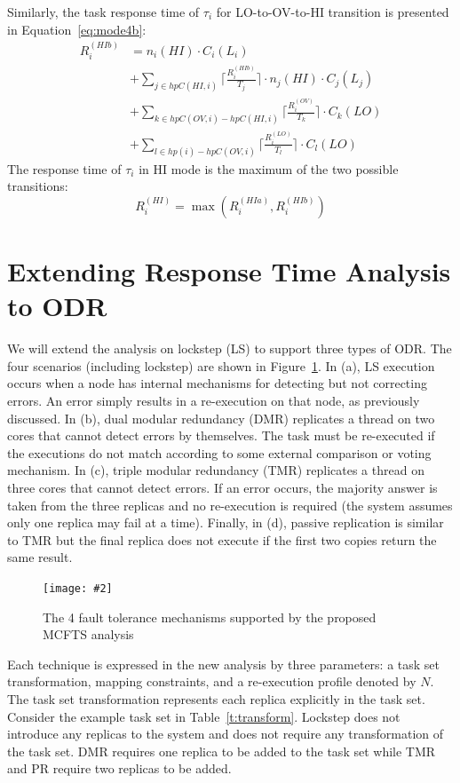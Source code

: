 \documentclass[conference]{IEEEtran}
\newcommand{\addfigure}[4]{
\begin{figure}[fh]
	\centering
	\texttt{[image: \#2]}
	\caption{#3}
	\label{#4}
\end{figure}
}
\begin{document}
Similarly, the task response time of $\tau_i$ for LO-to-OV-to-HI transition is presented in Equation~\eqref{eq:mode4b}:
\begin{equation}\label{eq:mode4b}
\begin{aligned}
R_i^{(HIb)} & = n_i(HI) \cdot C_i(L_i) \\
&  +\sum_{j \in hpC(HI,i)}\Big\lceil\frac{R_i^{(HIb)}}{T_j}\Big\rceil \cdot n_j(HI) \cdot C_j(L_j) \\
&  +\sum_{k \in hpC(OV,i)-hpC(HI,i)}\Big\lceil\frac{R_i^{(OV)}}{T_k}\Big\rceil \cdot C_k(LO)\\
&  +\sum_{l \in hp(i)-hpC(OV,i)}\Big\lceil\frac{R_i^{(LO)}}{T_l}\Big\rceil \cdot C_l(LO)
\end{aligned}
\end{equation}
The response time of $\tau_i$ in HI mode is the maximum of the two possible transitions:
\begin{equation}
R_i^{(HI)}= \max(R_i^{(HIa)},R_i^{(HIb)})
\label{eq:mode4}
\end{equation}



\section{Extending Response Time Analysis to ODR}
\label{s:multicorerta}
	We will extend the analysis on lockstep (LS) to support three types of ODR. The four scenarios (including lockstep) are shown in Figure~\ref{f:ftm}. 
	In (a), LS execution occurs when a node has internal mechanisms for detecting but not correcting errors. 
	An error simply results in a re-execution on that node, as previously discussed. 	
	In (b), dual modular redundancy (DMR) replicates a thread on two cores that cannot detect errors by themselves. 
	The task must be re-executed if the executions do not match according to some external comparison or voting mechanism.
	In (c), triple modular redundancy (TMR) replicates a thread on three cores that cannot detect errors. 
	If an error occurs, the majority answer is taken from the three replicas and no re-execution is required (the system assumes only one replica may fail at a time).
	Finally, in (d), passive replication is similar to TMR but the final replica does not execute if the first two copies return the same result. 


\addfigure{0.55}{ftm.pdf}{The 4 fault tolerance mechanisms supported by the proposed MCFTS analysis}{f:ftm}
	
	Each technique is expressed in the new analysis by three parameters: a task set transformation, mapping constraints, and a re-execution profile denoted by $N$.
	The task set transformation represents each replica explicitly in the task set. 
	Consider the example task set in Table~\ref{t:transform}. 
	Lockstep does not introduce any replicas to the system and does not require any transformation of the task set. 
	DMR requires one replica to be added to the task set while TMR and PR require two replicas to be added.
	
\end{document}
